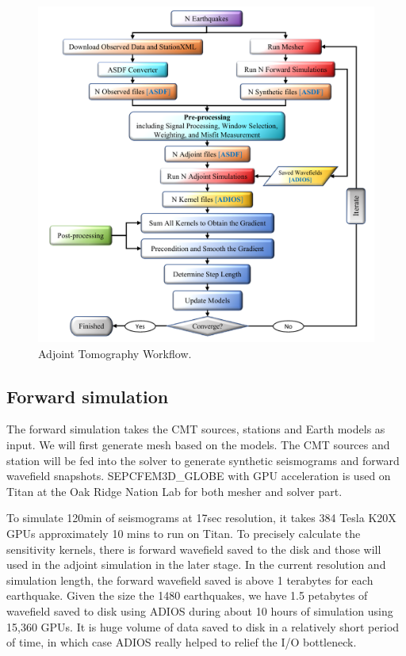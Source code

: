 \documentclass[extra,mreferee]{gji}
\begin{document}
\begin{figure}
  \centering
  \includegraphics[width=\textwidth]{figures/adjoint_workflow_6.pdf}
  \caption{Adjoint Tomography Workflow.}
  \label{fig:adjoint_workflow}
\end{figure}

\subsection{Forward simulation}
The forward simulation takes the CMT sources, stations and Earth models as input.
We will first generate mesh based on the models. The CMT sources and station will
be fed into the solver to generate synthetic seismograms and forward wavefield snapshots.
SEPCFEM3D\_GLOBE with GPU acceleration is used on Titan at the Oak Ridge Nation Lab for
both mesher and solver part.

To simulate 120min of seismograms at 17sec resolution, it takes 384 Tesla K20X
GPUs approximately 10 mins to run on Titan. To precisely calculate the sensitivity
kernels, there is forward wavefield saved to the disk and those will used in the
adjoint simulation in the later stage. In the current resolution
and simulation length, the forward wavefield saved is above 1 terabytes
for each earthquake. Given the size the 1480 earthquakes, we have 1.5 petabytes of
wavefield saved to disk using ADIOS\citep{liu2014hello} during about 10 hours
of simulation using 15,360 GPUs.
It is huge volume of data saved to disk in a relatively short period of time, in which case
ADIOS really helped to relief the I/O bottleneck.
\end{document}

